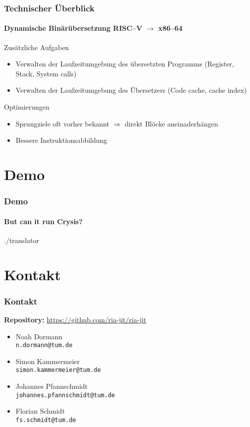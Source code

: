 \documentclass[aspectratio=169, sectionpage=false, german]{tumbeamer}
\newcommand{\blueverb}[1]{{\color{TUMBlue} \texttt{#1}}}
\newcommand{\conclude}[0]{\ensuremath{\Longrightarrow} }
\newcommand{\refer}[0]{\ensuremath{\rightarrow} }
\begin{document}
\begin{frame}
	\frametitle{Technischer Überblick}

	\framesubtitle {Dynamische Binärübersetzung RISC--V \refer x86--64}

	\begin{block}{Zusätzliche Aufgaben}
		\begin{itemize}
			\item Verwalten der Laufzeitumgebung des übersetzten Programms (Register, Stack, System calls)
			\item Verwalten der Laufzeitumgebung des Übersetzers (Code cache, cache index)
		\end{itemize}
	\end{block}
	\vspace{0.75cm}

	\begin{block}{Optimierungen}
		\begin{itemize}
			\item Sprungziele oft vorher bekannt \conclude direkt Blöcke aneinaderhängen
			\item Bessere Instruktionsabbildung
		\end{itemize}
	\end{block}
\end{frame}

\section{Demo}
\begin{frame}[c]
	\frametitle{Demo}
	\framesubtitle{But can it run Crysis?}
	\centering\Huge\ttfamily
	./translator
\end{frame}


\section{Kontakt}
\begin{frame}[c]
	\frametitle{Kontakt}
	\textbf{Repository:}\hspace{0.25cm} {\color{TUMBlue}\url{https://github.com/ria-jit/ria-jit}}
	
	\vspace{0.75cm}
	
	\begin{itemize}
		\item Noah Dormann\\\blueverb{n.dormann@tum.de}
		\item Simon Kammermeier\\\blueverb{simon.kammermeier@tum.de}
		\item Johannes Pfannschmidt\\\blueverb{johannes.pfannschmidt@tum.de}
		\item Florian Schmidt\\\blueverb{fs.schmidt@tum.de}
	\end{itemize}
\end{frame}
\end{document}
